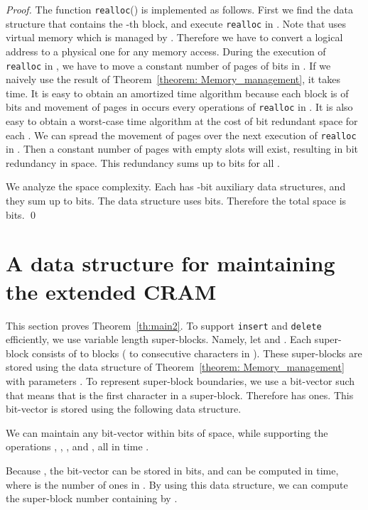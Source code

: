 \documentclass{llncs}
\begin{document}
\begin{proof}
The function \texttt{realloc}() is implemented as follows.
First we find the data structure  that contains the -th block,
and execute \texttt{realloc} in .  Note that  uses virtual memory
which is managed by .  Therefore we have to convert a logical address to
a physical one for any memory access.
During the execution of \texttt{realloc} in , we have to move a constant
number of pages of  bits in .
If we naively use the result of Theorem~\ref{theorem: Memory_management},
it takes  time.  It is easy to obtain an amortized  time
algorithm because each block is of  bits and movement of pages in 
occurs every  operations of \texttt{realloc} in .
It is also easy to obtain a worst-case  time algorithm at the cost
of  bit redundant space for each .  We can spread the movement
of pages over the next  execution of \texttt{realloc} in .
Then a constant number of pages with empty slots will exist, resulting in 
bit redundancy in space.  This redundancy sums up to 
 bits for all .

We analyze the space complexity.  Each  has -bit
auxiliary data structures, and they sum up to  bits.
The data structure  uses  bits.
Therefore the total space is  bits.
\qed
\end{proof}




\section{A data structure for maintaining the extended CRAM}
\label{sec:indel}

This section proves Theorem~\ref{th:main2}.
To support \texttt{insert} and \texttt{delete} efficiently,
we use variable length super-blocks.  
Namely, let  and .
Each super-block consists of  to  blocks
( to  consecutive characters in ).
These super-blocks are stored using the data structure of Theorem~\ref{theorem: Memory_management} with parameters .
To represent super-block boundaries, we use a bit-vector 
such that  means that  is the first character in a super-block.
Therefore  has  ones.  
This bit-vector is stored using the following data structure.
\begin{lemma}\label{lem2:GS}
We can maintain any bit-vector  within   bits of space,
while supporting the operations , ,
 , and ,
all in time .
\end{lemma}

Because , the bit-vector can be stored
in  bits,
and  can be computed in  time,
where  is the number of ones in .
By using this data structure, we can compute the super-block number containing  by .
\end{document}
